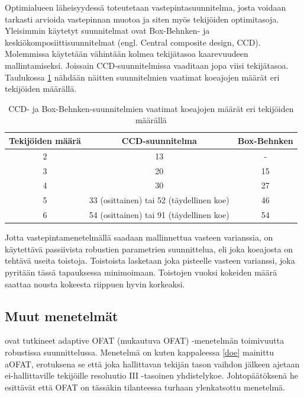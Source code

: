 \documentclass[12pt,a4paper,finnish]{tutthesis}
\begin{document}
Optimialueen läheisyydessä toteutetaan vastepintasuunnitelma, josta voidaan
tarkasti arvioida vastepinnan muotoa ja siten myös tekijöiden optimitasoja.
Yleisimmin käytetyt suunnitelmat ovat Box-Behnken- ja keskiökomposiittisuunnitelmat
(engl. Central composite design, CCD). Molemmissa käytetään vähintään kolmea
tekijätasoa kaarevuudeen mallintamiseksi. Joissain CCD-suunnitelmissa vaaditaan
jopa viisi tekijätasoa. Taulukossa \ref{vpsuunnitelmat} nähdään näitten suunnitelmien vaatimat
koeajojen määrät eri tekijöiden määrällä.

\begin{table}[]
\centering
\caption{CCD- ja Box-Behnken-suunnitelmien vaatimat koeajojen määrät eri tekijöiden määrällä \parencite{ehandbook}}
\label{vpsuunnitelmat}
\begin{tabular}{ccc}
\hline
\textbf{Tekijöiden määrä} & \textbf{CCD-suunnitelma}                 & \textbf{Box-Behnken} \\ \hline
2                         & 13                                       & -                    \\
3                         & 20                                       & 15                   \\
4                         & 30                                       & 27                   \\
5                         & 33 (osittainen) tai 52 (täydellinen koe) & 46                   \\
6                         & 54 (osittainen) tai 91 (täydellinen koe) & 54                  
\end{tabular}
\end{table}

Jotta vastepintamenetelmällä saadaan mallinnettua vasteen varianssia, on käytettävä
passiivista robustien parametrien suunnittelua, eli
joka koeajosta on tehtävä useita toistoja. Toistoista lasketaan joka pisteelle vasteen
varianssi, joka pyritään tässä tapauksessa minimoimaan. Toistojen vuoksi
kokeiden määrä saattaa nousta kokeesta riippuen hyvin korkeaksi.


\subsection{Muut menetelmät}

\textcite{frey2008adaptive} ovat tutkineet adaptive OFAT (mukautuva OFAT) -menetelmän
toimivuutta robustissa suunnittelussa. Menetelmä on kuten kappaleessa \ref{doe} mainittu
aOFAT, erotuksena se että joka hallittavan tekijän tason vaihdon
jälkeen ajetaan ei-hallittaville tekijöille resoluutio III -tasoinen
yhdistelykoe. Johtopäätöksenä he esittävät että OFAT on tässäkin tilanteessa
turhaan ylenkatsottu menetelmä.
\end{document}
